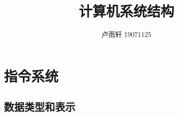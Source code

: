 \documentclass{ctexart}
\title{计算机系统结构}
\author{卢雨轩 19071125}
\begin{document}
\maketitle
\tableofcontents

\section{指令系统}
\subsection{数据类型和表示}
\end{document}
